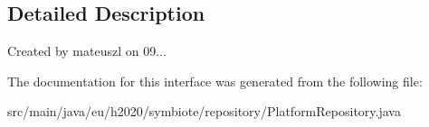 \subsection{Detailed Description}
Created by mateuszl on 09... 

The documentation for this interface was generated from the following file\+:\begin{DoxyCompactItemize}
\item 
src/main/java/eu/h2020/symbiote/repository/Platform\+Repository.\+java\end{DoxyCompactItemize}
